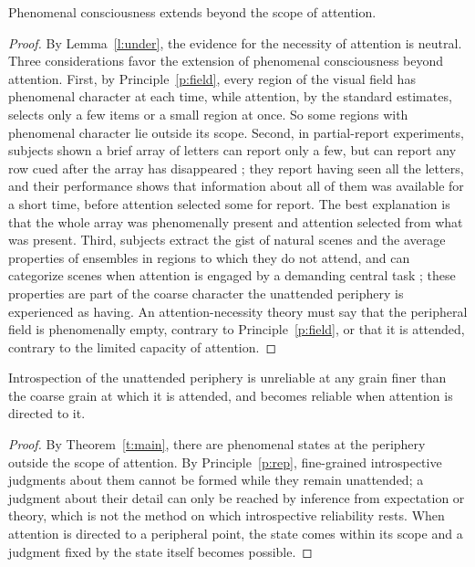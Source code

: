 \documentclass{situationist-preprint}
\begin{document}
\begin{theorem}\label{t:main}
Phenomenal consciousness extends beyond the scope of attention.
\end{theorem}

\begin{proof}
By Lemma~\ref{l:under}, the evidence for the necessity of attention is neutral. Three considerations favor the extension of phenomenal consciousness beyond attention. First, by Principle~\ref{p:field}, every region of the visual field has phenomenal character at each time, while attention, by the standard estimates, selects only a few items or a small region at once. So some regions with phenomenal character lie outside its scope. Second, in partial-report experiments, subjects shown a brief array of letters can report only a few, but can report any row cued after the array has disappeared \citep{Sperling1960}; they report having seen all the letters, and their performance shows that information about all of them was available for a short time, before attention selected some for report. The best explanation is that the whole array was phenomenally present and attention selected from what was present. Third, subjects extract the gist of natural scenes and the average properties of ensembles in regions to which they do not attend, and can categorize scenes when attention is engaged by a demanding central task \citep{Li2002}; these properties are part of the coarse character the unattended periphery is experienced as having. An attention-necessity theory must say that the peripheral field is phenomenally empty, contrary to Principle~\ref{p:field}, or that it is attended, contrary to the limited capacity of attention.
\end{proof}

\begin{corollary}\label{c:periph}
Introspection of the unattended periphery is unreliable at any grain finer than the coarse grain at which it is attended, and becomes reliable when attention is directed to it.
\end{corollary}

\begin{proof}
By Theorem~\ref{t:main}, there are phenomenal states at the periphery outside the scope of attention. By Principle~\ref{p:rep}, fine-grained introspective judgments about them cannot be formed while they remain unattended; a judgment about their detail can only be reached by inference from expectation or theory, which is not the method on which introspective reliability rests. When attention is directed to a peripheral point, the state comes within its scope and a judgment fixed by the state itself becomes possible.
\end{proof}
\end{document}
